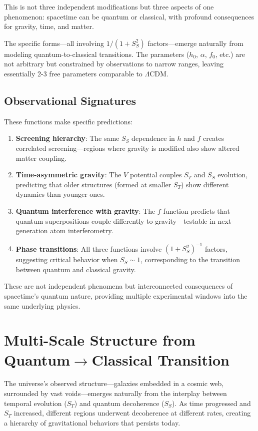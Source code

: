 \documentclass[12pt]{article}
\begin{document}
This is not three independent modifications but three aspects of one phenomenon: spacetime can be quantum or classical, with profound consequences for gravity, time, and matter.

The specific forms---all involving $1/(1 + S_S^2)$ factors---emerge naturally from modeling quantum-to-classical transitions. The parameters ($h_0$, $\alpha$, $f_0$, etc.) are not arbitrary but constrained by observations to narrow ranges, leaving essentially 2-3 free parameters comparable to $\Lambda$CDM.

\subsection{Observational Signatures}

These functions make specific predictions:
\begin{enumerate}
    \item \textbf{Screening hierarchy}: The same $S_S$ dependence in $h$ and $f$ creates correlated screening---regions where gravity is modified also show altered matter coupling.
    \item \textbf{Time-asymmetric gravity}: The $V$ potential couples $S_T$ and $S_S$ evolution, predicting that older structures (formed at smaller $S_T$) show different dynamics than younger ones.
    \item \textbf{Quantum interference with gravity}: The $f$ function predicts that quantum superpositions couple differently to gravity---testable in next-generation atom interferometry.
    \item \textbf{Phase transitions}: All three functions involve $(1 + S_S^2)^{-1}$ factors, suggesting critical behavior when $S_S \sim 1$, corresponding to the transition between quantum and classical gravity.
\end{enumerate}

These are not independent phenomena but interconnected consequences of spacetime's quantum nature, providing multiple experimental windows into the same underlying physics.



\section{Multi-Scale Structure from Quantum$\rightarrow$Classical Transition}

The universe's observed structure---galaxies embedded in a cosmic web, surrounded by vast voids---emerges naturally from the interplay between temporal evolution ($S_T$) and quantum decoherence ($S_S$). As time progressed and $S_T$ increased, different regions underwent decoherence at different rates, creating a hierarchy of gravitational behaviors that persists today.
\end{document}
